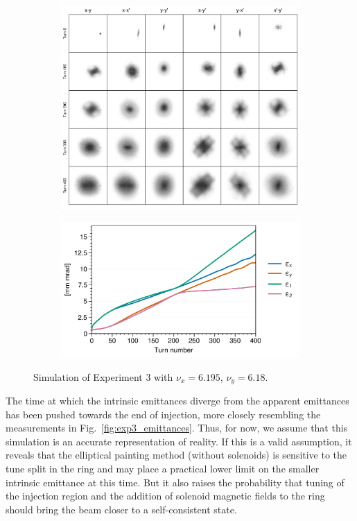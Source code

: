 %
\begin{figure}[!p]
    \centering
    \begin{subfigure}{\textwidth}
        \includegraphics[width=\textwidth]{Images/chapter5/exp3/sim_snapshots_nux6.195_nuy6.18.png}
    \end{subfigure}
    \vfill
    \vspace*{1.0cm}
    \vfill
    \begin{subfigure}{0.7\textwidth}
        \includegraphics[width=\textwidth]{Images/chapter5/exp3/sim_emittances_nux6.195_nuy6.18.png}
    \end{subfigure}
    \caption{Simulation of Experiment 3 with $\nu_x = 6.195$, $\nu_y = 6.18$.}
    \label{fig:exp3_sim_nux6.195_nuy6.18}
\end{figure}
%
The time at which the intrinsic emittances diverge from the apparent emittances has been pushed towards the end of injection, more closely resembling the measurements in Fig.~\ref{fig:exp3_emittances}. Thus, for now, we assume that this simulation is an accurate representation of reality. If this is a valid assumption, it reveals that the elliptical painting method (without solenoids) is sensitive to the tune split in the ring and may place a practical lower limit on the smaller intrinsic emittance at this time. But it also raises the probability that tuning of the injection region and the addition of solenoid magnetic fields to the ring should bring the beam closer to a self-consistent state.



